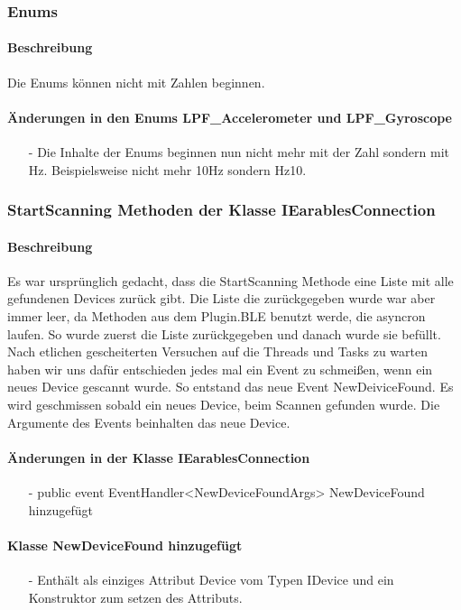 \documentclass[a4paper,12pt]{article}
\begin{document}
\subsubsection{Enums }
\paragraph{Beschreibung}
Die Enums können nicht mit Zahlen beginnen.
\paragraph{Änderungen in den Enums LPF\_Accelerometer und LPF\_Gyroscope}
\begin{itemize}
	 \item[-] Die Inhalte der Enums beginnen nun nicht mehr mit der Zahl sondern mit Hz. Beispielsweise nicht mehr 10Hz sondern Hz10.
\end{itemize}

\subsubsection{StartScanning Methoden der Klasse IEarablesConnection}
\paragraph{Beschreibung}
Es war ursprünglich gedacht, dass die StartScanning Methode eine Liste mit alle gefundenen Devices zurück gibt. Die Liste die zurückgegeben wurde war aber immer leer, da Methoden aus dem Plugin.BLE benutzt werde, die asyncron laufen. So wurde zuerst die Liste zurückgegeben und danach wurde sie befüllt. Nach etlichen gescheiterten Versuchen auf die Threads und Tasks zu warten haben wir uns dafür entschieden jedes mal ein Event zu schmeißen, wenn ein neues Device gescannt wurde. So entstand das neue Event NewDeiviceFound. Es wird geschmissen sobald ein neues Device, beim Scannen gefunden wurde. Die Argumente des Events beinhalten das neue Device.
\paragraph{Änderungen in der Klasse IEarablesConnection}
\begin{itemize}
	 \item[-] public event EventHandler<NewDeviceFoundArgs> NewDeviceFound hinzugefügt
\end{itemize}
\paragraph{Klasse NewDeviceFound hinzugefügt}
\begin{itemize}
	 \item[-] Enthält als einziges Attribut Device vom Typen IDevice und ein Konstruktor zum setzen des Attributs.
\end{itemize}
\end{document}
